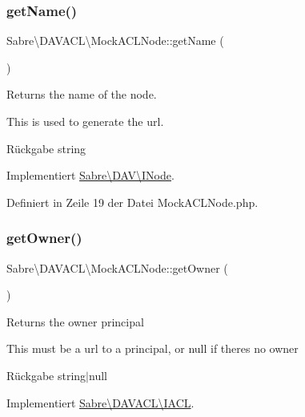 \subsubsection{\texorpdfstring{get\+Name()}{getName()}}
{\footnotesize\ttfamily Sabre\textbackslash{}\+D\+A\+V\+A\+C\+L\textbackslash{}\+Mock\+A\+C\+L\+Node\+::get\+Name (\begin{DoxyParamCaption}{ }\end{DoxyParamCaption})}

Returns the name of the node.

This is used to generate the url.

\begin{DoxyReturn}{Rückgabe}
string 
\end{DoxyReturn}


Implementiert \mbox{\hyperlink{interface_sabre_1_1_d_a_v_1_1_i_node_ab616fe836b1ae36af12126a2bc934dce}{Sabre\textbackslash{}\+D\+A\+V\textbackslash{}\+I\+Node}}.



Definiert in Zeile 19 der Datei Mock\+A\+C\+L\+Node.\+php.

\mbox{\label{class_sabre_1_1_d_a_v_a_c_l_1_1_mock_a_c_l_node_a24283bdd3d5c45d8aeae2fba3324fefa}} 
\subsubsection{\texorpdfstring{get\+Owner()}{getOwner()}}
{\footnotesize\ttfamily Sabre\textbackslash{}\+D\+A\+V\+A\+C\+L\textbackslash{}\+Mock\+A\+C\+L\+Node\+::get\+Owner (\begin{DoxyParamCaption}{ }\end{DoxyParamCaption})}

Returns the owner principal

This must be a url to a principal, or null if there\textquotesingle{}s no owner

\begin{DoxyReturn}{Rückgabe}
string$\vert$null 
\end{DoxyReturn}


Implementiert \mbox{\hyperlink{interface_sabre_1_1_d_a_v_a_c_l_1_1_i_a_c_l_a05f531b4ae1a86eab4e6e95b0413390e}{Sabre\textbackslash{}\+D\+A\+V\+A\+C\+L\textbackslash{}\+I\+A\+CL}}.



